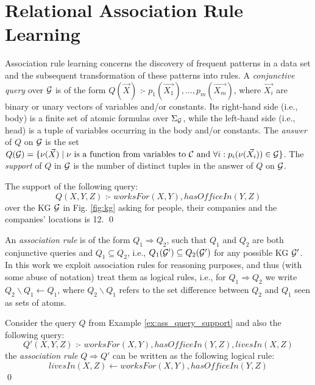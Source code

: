 \section{Relational Association Rule Learning}
Association rule learning concerns the discovery of frequent patterns in a data set and the subsequent transformation of these patterns into rules.
A \emph{conjunctive query} over $\mathcal{G}$ is of the form $Q(\vec{X}) \text{ :- } p_1(\vec{X_1}),\dotsc,p_m(\vec{X_m})$, where $\vec{X_i}$ are binary or unary vectors of variables and/or constants. Its  right-hand side (i.e., body) is a finite set of atomic formulas over $\Sigma_{\mathcal{G}}$, while the left-hand side (i.e., head) is a tuple of variables occurring in the body and/or constants. The \emph{answer} of $Q$ on $\mathcal{G}$ is the set $Q(\mathcal{G}) = \{ \nu(\vec{X}) \mid \nu \text{ is a function from variables to } \mathcal{C} \text{ and } \forall i: p_i(\nu(\vec{X_i})) \in \mathcal{G} \}$.
The \emph{support} of
$Q$ in $\mathcal{G}$ is the number of distinct tuples in the answer of $Q$ on $\mathcal{G}$. 
\begin{example}
\label{ex:ass_query_support}
The support of the following query:
\[Q(X,Y,Z) \text{ :- } worksFor(X,Y), hasOfficeIn(Y,Z)\]
over the KG $\mathcal{G}$ in Fig. \ref{fig:kg} asking for people, their companies and the companies' locations is 12. \qed
\end{example}
An \emph{association rule} is of the form $Q_1 \Rightarrow  Q_2$, such that $Q_1$ and $Q_2$ are both conjunctive queries and $Q_1 \subseteq Q_2$, i.e., $Q_1(\mathcal{G}')\subseteq Q_2(\mathcal{G}')$ for any possible KG $\mathcal{G}'$. In this work we exploit association rules for reasoning purposes, and thus (with some abuse of notation) treat them as logical rules, i.e., for $Q_1\Rightarrow Q_2$ we write $Q_2\backslash Q_1 \leftarrow Q_1$, where $Q_2 \backslash Q_1$ refers to the set difference between $Q_2$ and $Q_1$ seen as sets of atoms.
\begin{example}
Consider the query $Q$ from Example \ref{ex:ass_query_support} and also the following query:
\[Q'(X,Y,Z) \text{ :- } worksFor(X,Y), hasOfficeIn(Y,Z), livesIn(X,Z)\]
the \textit{association rule} $Q \Rightarrow Q'$ can be written as the following logical rule:\[livesIn(X,Z) \leftarrow worksFor(X,Y), hasOfficeIn(Y,Z)\]\qed
\end{example}

